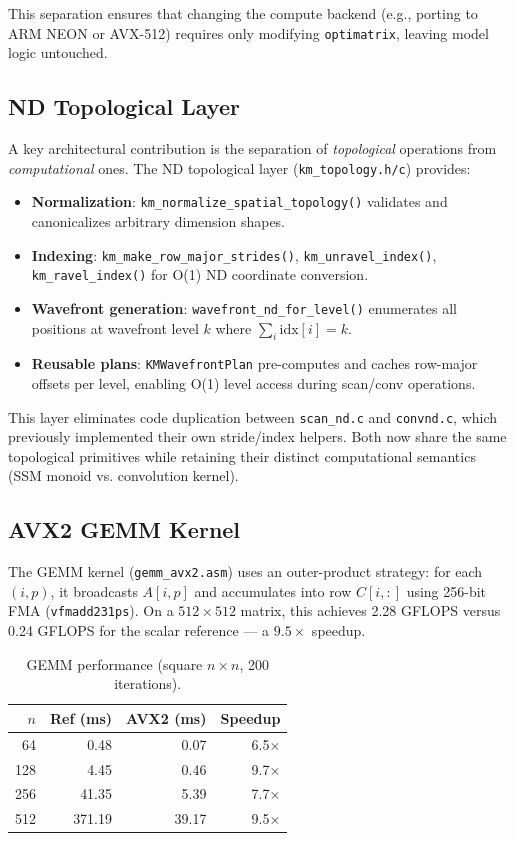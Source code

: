 \documentclass[10pt,onecolumn]{article}
\begin{document}
This separation ensures that changing the compute backend
(e.g., porting to ARM NEON or AVX-512) requires only modifying
\texttt{optimatrix}, leaving model logic untouched.

\subsection{ND Topological Layer}

A key architectural contribution is the separation of \emph{topological} operations from \emph{computational} ones. The ND topological layer (\texttt{km\_topology.h/c}) provides:

\begin{itemize}
  \item \textbf{Normalization}: \texttt{km\_normalize\_spatial\_topology()} validates and canonicalizes arbitrary dimension shapes.
  \item \textbf{Indexing}: \texttt{km\_make\_row\_major\_strides()}, \texttt{km\_unravel\_index()}, \texttt{km\_ravel\_index()} for O(1) ND coordinate conversion.
  \item \textbf{Wavefront generation}: \texttt{wavefront\_nd\_for\_level()} enumerates all positions at wavefront level $k$ where $\sum_i \text{idx}[i] = k$.
  \item \textbf{Reusable plans}: \texttt{KMWavefrontPlan} pre-computes and caches row-major offsets per level, enabling O(1) level access during scan/conv operations.
\end{itemize}

This layer eliminates code duplication between \texttt{scan\_nd.c} and \texttt{convnd.c}, which previously implemented their own stride/index helpers. Both now share the same topological primitives while retaining their distinct computational semantics (SSM monoid vs.
convolution kernel).

\subsection{AVX2 GEMM Kernel}

The GEMM kernel (\texttt{gemm\_avx2.asm}) uses an outer-product strategy:
for each $(i, p)$, it broadcasts $A[i,p]$ and accumulates into row $C[i,:]$
using 256-bit FMA (\texttt{vfmadd231ps}).
On a $512 \times 512$ matrix, this achieves 2.28 GFLOPS versus
0.24 GFLOPS for the scalar reference — a $9.5\times$ speedup.

\begin{table}[htbp]
\centering
\caption{GEMM performance (square $n \times n$, 200 iterations).}
\label{tab:gemm}
\begin{tabular}{rrrr}
\toprule
$n$ & Ref (ms) & AVX2 (ms) & Speedup \\
\midrule
 64 & 0.48 & 0.07 & 6.5× \\
128 & 4.45 & 0.46 & 9.7× \\
256 & 41.35 & 5.39 & 7.7× \\
512 & 371.19 & 39.17 & 9.5× \\
\bottomrule
\end{tabular}
\end{table}
\end{document}
